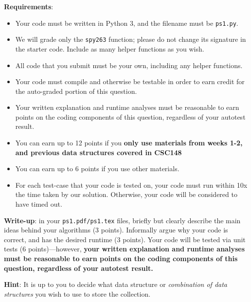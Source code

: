 \documentclass{assignment-263}
\begin{document}
\begin{enumerate}
\textbf{Requirements}:
\begin{itemize}
\item Your code must be written in Python 3, and the filename must be \verb|ps1.py|.
\item We will grade only the \verb|spy263| function;
      please do not change its signature in the starter code.
      Include as many helper functions as you wish.
\item All code that you submit must be your own, including any helper functions.
\item Your code must compile and otherwise be testable in order to earn credit
      for the auto-graded portion of this question.
\item Your written explanation and runtime analyses must be reasonable to earn points
      on the coding components of this question, regardless of your autotest result.
\item You can earn up to 12 points if you \textbf{only use materials from weeks 1-2, and previous data structures covered in CSC148}
\item You can earn up to 6 points if you use other materials.
\item For each test-case that your code is tested on, your code must run within
10x the time taken by our solution. Otherwise, your code will be considered to have timed out.
\end{itemize}

\textbf{Write-up}: in your \verb|ps1.pdf/ps1.tex| files, briefly 
but clearly describe the main ideas behind your algorithms (3 points).
Informally argue why your code is correct, and has the desired runtime (3 points).
Your code will be tested via unit tests (6 points)---however, 
\textbf{your written explanation and runtime analyses must be reasonable to earn points
on the coding components of this question, regardless of your autotest result.}

\textbf{Hint}: It is up to you to decide what data structure or
\textit{combination of data structures} you wish to use to store the collection.


\end{enumerate}
\end{document}
